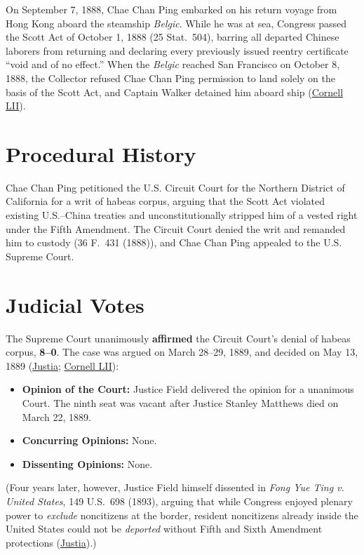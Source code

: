\documentclass[12pt]{article}
\begin{document}
On September 7, 1888, Chae Chan Ping embarked on his return voyage from Hong Kong aboard the steamship \textit{Belgic}. While he was at sea, Congress passed the Scott Act of October 1, 1888 (25 Stat.\ 504), barring all departed Chinese laborers from returning and declaring every previously issued reentry certificate ``void and of no effect.'' When the \textit{Belgic} reached San Francisco on October 8, 1888, the Collector refused Chae Chan Ping permission to land solely on the basis of the Scott Act, and Captain Walker detained him aboard ship (\href{https://www.law.cornell.edu/supremecourt/text/130/581}{Cornell LII}).

\section{Procedural History}
Chae Chan Ping petitioned the U.S. Circuit Court for the Northern District of California for a writ of habeas corpus, arguing that the Scott Act violated existing U.S.--China treaties and unconstitutionally stripped him of a vested right under the Fifth Amendment. The Circuit Court denied the writ and remanded him to custody (36 F.\ 431 (1888)), and Chae Chan Ping appealed to the U.S. Supreme Court.

\section{Judicial Votes}
The Supreme Court unanimously \textbf{affirmed} the Circuit Court's denial of habeas corpus, \textbf{8--0}. The case was argued on March 28--29, 1889, and decided on May 13, 1889 (\href{https://supreme.justia.com/cases/federal/us/130/581/}{Justia}; \href{https://www.law.cornell.edu/supremecourt/text/130/581}{Cornell LII}):

\begin{itemize}
    \item \textbf{Opinion of the Court:} Justice Field delivered the opinion for a unanimous Court. The ninth seat was vacant after Justice Stanley Matthews died on March 22, 1889.
    \item \textbf{Concurring Opinions:} None.
    \item \textbf{Dissenting Opinions:} None.
\end{itemize}

(Four years later, however, Justice Field himself dissented in \textit{Fong Yue Ting v. United States}, 149 U.S.\ 698 (1893), arguing that while Congress enjoyed plenary power to \textit{exclude} noncitizens at the border, resident noncitizens already inside the United States could not be \textit{deported} without Fifth and Sixth Amendment protections (\href{https://supreme.justia.com/cases/federal/us/149/698/}{Justia}).)
\end{document}
